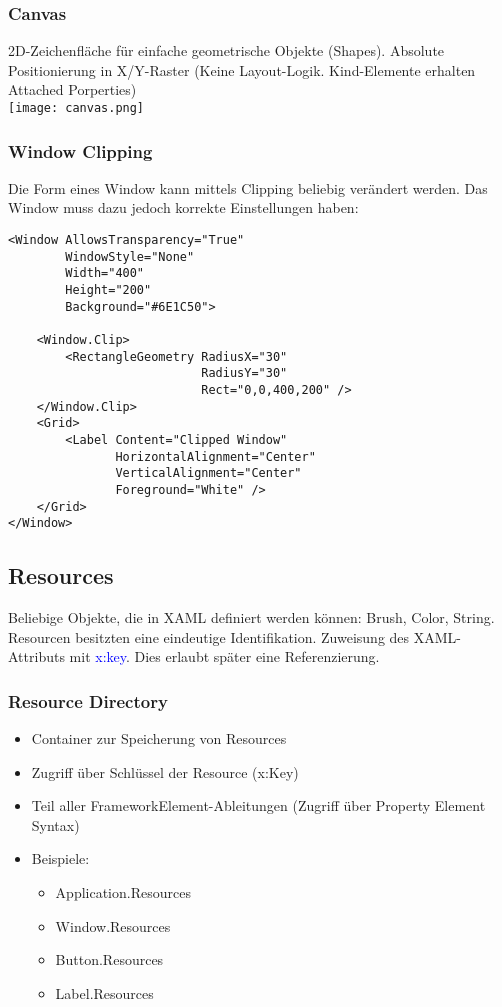 \subsubsection{Canvas}
2D-Zeichenfläche für einfache geometrische Objekte (Shapes). Absolute Positionierung in X/Y-Raster (Keine Layout-Logik. Kind-Elemente erhalten Attached Porperties)\\
\texttt{[image: canvas.png]}
\subsubsection{Window Clipping}
Die Form eines Window kann mittels Clipping beliebig verändert werden. Das Window muss dazu jedoch korrekte Einstellungen haben:
\begin{lstlisting}
<Window AllowsTransparency="True"
        WindowStyle="None"
        Width="400"
        Height="200"
        Background="#6E1C50">

    <Window.Clip>
        <RectangleGeometry RadiusX="30"
                           RadiusY="30"
                           Rect="0,0,400,200" />
    </Window.Clip>
    <Grid>
        <Label Content="Clipped Window"
               HorizontalAlignment="Center"
               VerticalAlignment="Center"
               Foreground="White" />
    </Grid>
</Window>
\end{lstlisting}
\subsection{Resources}
Beliebige Objekte, die in XAML definiert werden können: Brush, Color, String.\\
Resourcen besitzten eine eindeutige Identifikation. Zuweisung des XAML-Attributs mit \textcolor{blue}{x:key}. Dies erlaubt später eine Referenzierung.
\subsubsection{Resource Directory}
\begin{itemize}[topsep=0pt, leftmargin=4mm]
    \setlength\itemsep{-0.3em}
    \item Container zur Speicherung von Resources
    \item Zugriff über Schlüssel der Resource (x:Key)
    \item Teil aller FrameworkElement-Ableitungen (Zugriff über Property Element Syntax)
    \item Beispiele:
    \begin{itemize}[topsep=0pt, leftmargin=4mm]
        \setlength\itemsep{-0.3em}
        \item Application.Resources
        \item Window.Resources
        \item Button.Resources
        \item Label.Resources
    \end{itemize}
\end{itemize}
